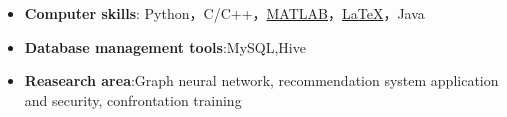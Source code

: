   \begin{itemize}[leftmargin=*]
    \item \textbf{Computer skills}: Python，C/C++，\href{https://www.mathworks.com/}{MATLAB}，\href{https://www.latex-project.org/}{\LaTeX}，Java
   \item \textbf{Database management tools}:MySQL,Hive
	\item \textbf{Reasearch area}:Graph neural network, recommendation system application and security, confrontation training
  \end{itemize}